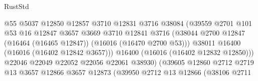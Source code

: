 \begin{lexlean}{RustStd}
\begin{coremodule}
                                            @55
                                            @5037
                                            @12850
                                            @12857
                                            @3710
                                            @12831
                                            @3716
                                            @38084
                                            (@39559
                                              @2701
                                              @101
                                              @53
                                              @16
                                              @12847
                                              @3657
                                              @3669
                                              @3710
                                              @12841
                                              @3716
                                              (@38044
                                                @2700
                                                @12847
                                                (@16464 (@16465 @12847))
                                                (@16016 (@16470 @2700 @53)))
                                              @38011
                                              @16400
                                              (@16016 (@16402 @12842 @3657)))
                                            @16400
                                            (@16016 (@16402 @12832 @12850)))
                                          @22046
                                          @22049
                                          @22052
                                          @22056
                                          @22061
                                          @38930)
                                        (@39605
                                          @12860
                                          @2712
                                          @2719
                                          @13
                                          @3657
                                          @12866
                                          @3657
                                          @12873
                                          (@39950
                                            @2712
                                            @13
                                            @12866
                                            (@38106
                                              @2711

\end{coremodule}
\end{lexlean}
